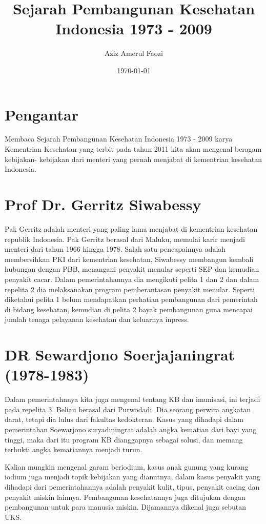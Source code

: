 \documentclass[11pt]{article}
\author{Aziz Amerul Faozi}
\date{\today}
\title{Sejarah Pembangunan Kesehatan Indonesia 1973 - 2009}
\begin{document}
\maketitle
\tableofcontents


\section{Pengantar}
\label{sec:orgfaf956b}
Membaca Sejarah Pembangunan Kesehatan Indonesia 1973 - 2009 karya Kementrian
Kesehatan yang terbit pada tahun 2011 kita akan mengenal beragam kebijakan-
kebijakan dari menteri yang pernah menjabat di kementrian kesehatan Indonesia.

\section{Prof Dr. Gerritz Siwabessy}
\label{sec:org78a787d}
Pak Gerritz adalah menteri yang paling lama menjabat di kementrian kesehatan
republik Indonesia. Pak Gerritz berasal dari Maluku, memulai karir menjadi menteri
dari tahun 1966 hingga 1978. Salah satu pencapainnya adalah membersihkan PKI
dari kementrian kesehatan, Siwabessy membangun kembali hubungan dengan PBB,
menangani penyakit menular seperti SEP dan kemudian penyakit cacar. Dalam
pemerintahannya dia mengikuti pelita 1 dan 2 dan dalam repelita 2 dia melaksanakan
program pemberantasan penyakit menular.
Seperti diketahui pelita 1 belum mendapatkan perhatian pembangunan dari pemerintah
di bidang kesehatan, kemudian di pelita 2 bayak pembangunan guna mencapai
jumlah tenaga pelayanan kesehatan dan keluarnya inpress.

\section{DR Sewardjono Soerjajaningrat (1978-1983)}
\label{sec:org40332b7}
Dalam pemerintahnnya kita juga mengenal tentang KB dan imunisasi,
ini terjadi pada repelita 3. Beliau berasal dari Purwodadi. Dia seorang perwira
angkatan darat, tetapi dia lulus dari fakultas kedokteran. Kasus yang dihadapi
dalam pemerintahan Soewarjono suryadiningrat adalah angka kematian dari
bayi yang tinggi, maka dari itu program KB dianggapnya sebagai solusi, dan
memang terbukti angka kematiannya menjadi turun.

Kalian mungkin mengenal garam beriodium, kasus anak gunung yang kurang iodium
juga menjadi topik kebijakan yang dianutnya, dalam kasus penyakit yang dihadapi
dari pemerintahannya adalah penyakit kulit, tipus, penyakit cacing dan penyakit
miskin lainnya. Pembangunan kesehatannya juga ditujukan dengan pembangunan untuk
para manusia miskin. Dijamannya dikenal juga sebutan UKS.
\end{document}
